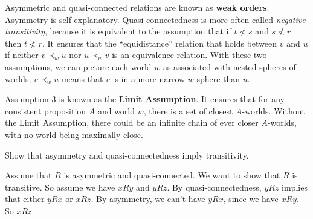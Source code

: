 Asymmetric and quasi-connected relations are known as \textbf{weak orders}.
Asymmetry is self-explanatory. Quasi-connectedness is more often called
\emph{negative transitivity}, because it is equivalent to the assumption that if
$t \not< s$ and $s\not<r$ then $t\not<r$. It ensures that the ``equidistance''
relation that holds between $v$ and $u$ if neither $v \prec_w u$ nor
$u \prec_w v$ is an equivalence relation. With these two assumptions, we can
picture each world $w$ as associated with nested spheres of worlds;
$v \prec_w u$ means that $v$ is in a more narrow $w$-sphere than $u$.

Assumption 3 is known as the \textbf{Limit Assumption}. It ensures that for any
consistent proposition $A$ and world $w$, there is a set of closest $A$-worlds.
Without the Limit Assumption, there could be an infinite chain of ever closer
$A$-worlds, with no world being maximally close.


\begin{exercise}
  Show that asymmetry and quasi-connectedness imply transitivity.
\end{exercise}
\begin{solution}
  Assume that $R$ is asymmetric and quasi-connected. We want to show that
  $R$ is transitive. So assume we have $xRy$ and $yRz$. By quasi-connectedness,
  $yRz$ implies that either $yRx$ or $xRz$. By asymmetry, we can't have $yRx$,
  since we have $xRy$. So $xRz$.
\end{solution}

